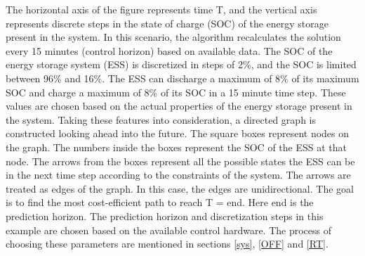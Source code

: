 {The horizontal axis of the figure represents time T, and the vertical axis represents discrete steps in the state of charge (SOC) of the energy storage present in the system. In this scenario, the algorithm recalculates the solution every 15 minutes (control horizon) based on available data. The SOC of the energy storage system (ESS) is discretized in steps of 2\%, and the SOC is limited between 96\% and 16\%. The ESS can discharge a maximum of 8\% of its maximum SOC and charge a maximum of 8\% of its SOC in a 15 minute time step. These values are chosen based on the actual properties of the energy storage present in the system. Taking these features into consideration, a directed graph is constructed looking ahead into the future. The square boxes represent nodes on the graph. The numbers inside the boxes represent the SOC of the ESS at that node. The arrows from the boxes represent all the possible states the ESS can be in the next time step according to the constraints of the system. The arrows are treated as edges of the graph. In this case, the edges are unidirectional. The goal is to find the most cost-efficient path to reach T = end. Here end is the prediction horizon. The prediction horizon and discretization steps in this example are chosen based on the available control hardware. The process of choosing these parameters are mentioned in sections \ref{sys}, \ref{OFF} and \ref{RT}.}


